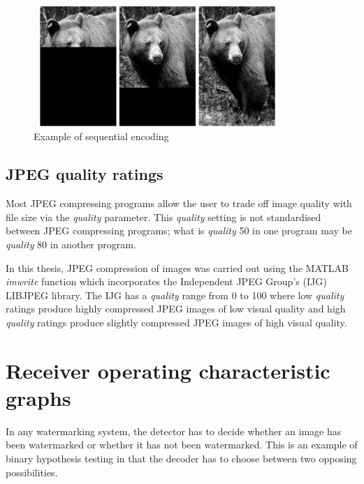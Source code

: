 \documentclass[12pt]{report}
\begin{document}
\begin{figure}[htb]
	\begin{center}
		\includegraphics[height=4.6cm,width=9.4cm]{bear_all_3.eps}
		\caption{Example of sequential encoding}
		\label{bearPics}
	\end{center}
\end{figure}

\section{JPEG quality ratings}
\label{jpgQual}
Most JPEG compressing programs allow the user to trade off image quality with 
file size via the \emph{quality} parameter. 
This \emph{quality} setting is not standardised between JPEG compressing programs;
what is \emph{quality} 50 in one program may be \emph{quality} 80 in another program.

In this thesis, JPEG compression of images was carried out using the MATLAB~\cite{matlab} \emph{imwrite} function
which incorporates the Independent JPEG Group's (IJG)~\cite{ijg} LIBJPEG library.
The IJG has
a \emph{quality} range from 0 to 100 where
low \emph{quality} ratings produce highly compressed JPEG images of low visual
quality and high \emph{quality} ratings produce slightly compressed JPEG images
of high visual quality. 

			
\chapter{Receiver operating characteristic graphs}
\label{chapter:rocAbt}
In any watermarking system, the detector has to decide whether an image has been watermarked
or whether it has not been watermarked. This is an example of binary hypothesis testing in that
the decoder has to choose between two opposing possibilities. 
\end{document}
